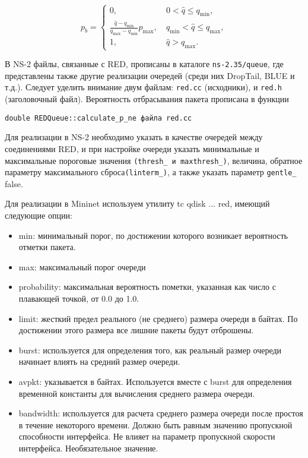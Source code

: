 \begin{equation}
\label{eq2:1}
p_{b} = \begin{cases}
        0, &  \ 0 < \hat{q} \leqslant q_{\min},
        \\
        \frac{\hat{q} - q_{\min}}{q_{\max} - q_{\min}} p_{\max}, & \ q_{\min} < \hat{q} \leqslant q_{\max}, 
        \\
        1, &  \ \hat{q} > q_{\max}.
\end{cases}                                     
\end{equation}


В NS-2 файлы, связанные с RED, прописаны в каталоге
\verb|ns-2.35/queue|, где представлены также другие реализации
очередей (среди них DropTail, BLUE и т.д.). Следует уделить внимание
двум файлам: \verb|red.cc| (исходники), и \verb|red.h| (заголовочный
файл). Вероятность отбрасывания пакета прописана в функции

\verb|double REDQueue::calculate_p_ne файла red.cc|

Для реализации в NS-2 необходимо указать в качестве очередей между соединениями
RED, и при настройке очереди указать минимальные и максимальные пороговые значения 
\verb|(thresh_ и maxthresh_)|, величина, обратное параметру максимального сброса\verb|(linterm_)|, 
а также указать параметр \verb|gentle_| false. 


Для реализации в Mininet используем утилиту tc qdisk ... red, имеющий следующие опции:
\begin{itemize}
\item min: минимальный порог, по достижении которого возникает вероятность отметки пакета.
\item max: максимальный порог очереди
\item probability: максимальная вероятность пометки, указанная как число с плавающей точкой, от 0.0 до 1.0. 
\item limit: жесткий предел реального (не среднего) размера очереди в байтах. По достижении этого размера все лишние пакеты будут отброшены.
\item burst: используется для определения того, как реальный размер очереди начинает влиять на средний размер очереди. 
\item avpkt: указывается в байтах. Используется вместе с burst для определения временной константы для вычисления среднего размера очереди.
\item bandwidth: используется для расчета среднего размера очереди после простоя в течение некоторого времени. Должно быть равным значению пропускной способности интерфейса. Не влияет на параметр пропускной скорости интерфейса. Необязательное значение.

\end{itemize}

